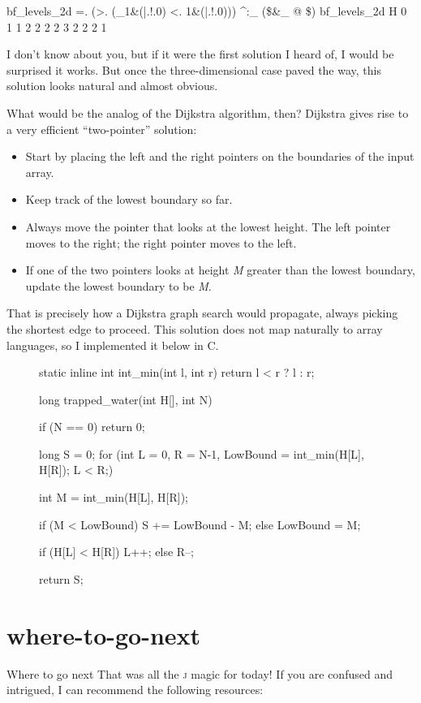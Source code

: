 \documentclass{article}
\begin{document}
\begin{code}[j]
    bf_levels_2d =. (>. (_1&(|.!.0) <. 1&(|.!.0))) ^:_ (\$&_ @ \$)
    bf_levels_2d H
0 1 1 2 2 2 2 3 2 2 2 1
\end{code}

I don't know about you, but if it were the first solution I heard of, I would be surprised it works.
But once the three-dimensional case paved the way, this solution looks natural and almost obvious.

What would be the analog of the Dijkstra algorithm, then?
Dijkstra gives rise to a very efficient ``two-pointer'' solution:

\begin{itemize}
  \item Start by placing the left and the right pointers on the boundaries of the input array.
  \item Keep track of the lowest boundary so far.
  \item
    Always move the pointer that looks at the lowest height.
    The left pointer moves to the right; the right pointer moves to the left.
  \item If one of the two pointers looks at height \emph{M} greater than the lowest boundary, update the lowest boundary to be \emph{M}.
\end{itemize}

That is precisely how a Dijkstra graph search would propagate, always picking the shortest edge to proceed.
This solution does not map naturally to array languages, so I implemented it below in C.

\begin{figure}
\begin{code}[c]
static inline int int_min(int l, int r) { return l < r ? l : r; }

long trapped_water(int H[], int N) {
  if (N == 0) return 0;

  long S = 0;
  for (int L = 0, R = N-1, LowBound = int_min(H[L], H[R]); L < R;) {
    int M = int_min(H[L], H[R]);

    if (M < LowBound) S += LowBound - M;
    else LowBound = M;

    if (H[L] < H[R]) L++; else R--;
  }
  return S;
}
\end{code}
\end{figure}

\section{where-to-go-next}{Where to go next}
That was all the \textsc{j} magic for today!
If you are confused and intrigued, I can recommend the following resources:
\end{document}
